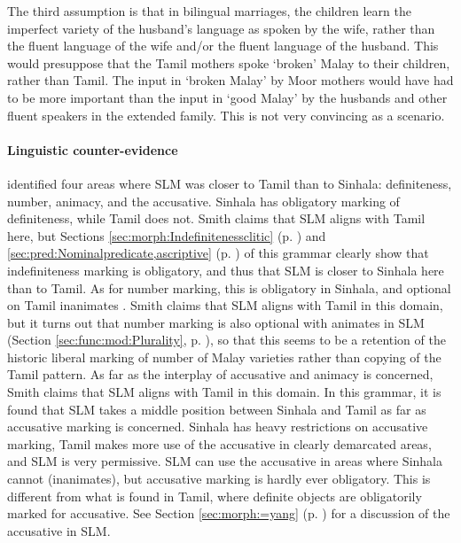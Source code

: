 The third assumption is that in bilingual marriages, the children learn the imperfect variety of the husband's language as spoken by the wife, rather than the fluent language of the wife and/or the fluent language of the husband. This would presuppose that the Tamil mothers spoke `broken' Malay to their children, rather than Tamil. The input in `broken Malay' by Moor mothers would have had to be more important than the input in `good Malay' by the husbands and other fluent speakers in the extended family. This is not very convincing as a scenario.


\paragraph{Linguistic counter-evidence}
\citet{SmithRH} identified four areas where SLM was closer to Tamil than to Sinhala: definiteness, number, animacy, and the accusative. Sinhala has obligatory marking of definiteness, while Tamil does not. Smith claims that SLM aligns with Tamil here, but Sections \ref{sec:morph:Indefinitenessclitic} (p. \pageref{sec:morph:Indefinitenessclitic}) and \ref{sec:pred:Nominalpredicate,ascriptive} (p. \pageref{sec:pred:Nominalpredicate,ascriptive})  of this grammar clearly show that indefiniteness marking is obligatory, and thus that SLM is closer to Sinhala here than to Tamil. As for number marking, this is obligatory in Sinhala, and optional on  Tamil inanimates \citep[20]{Lehmann1989}. Smith claims that SLM aligns with Tamil in this domain, but it turns out that number marking is also optional with animates in SLM (Section \ref{sec:func:mod:Plurality}, p. \pageref{sec:func:mod:Plurality}), so that this seems to be a retention of the historic liberal marking of number of Malay varieties rather than copying of the Tamil pattern. As far as the interplay of accusative and animacy is concerned, Smith claims that SLM aligns with Tamil in this domain. In this grammar, it is found that SLM takes a middle position between Sinhala and Tamil as far as accusative marking is concerned. Sinhala has heavy restrictions on accusative marking, Tamil makes more use of the accusative in clearly demarcated areas, and SLM is very permissive. SLM can use the accusative in areas where Sinhala cannot (inanimates), but accusative marking is hardly ever obligatory. This is different from what is found in Tamil, where definite objects are obligatorily marked for accusative. See Section \ref{sec:morph:=yang} (p. \pageref{sec:morph:=yang}) for a discussion of the accusative in SLM.

